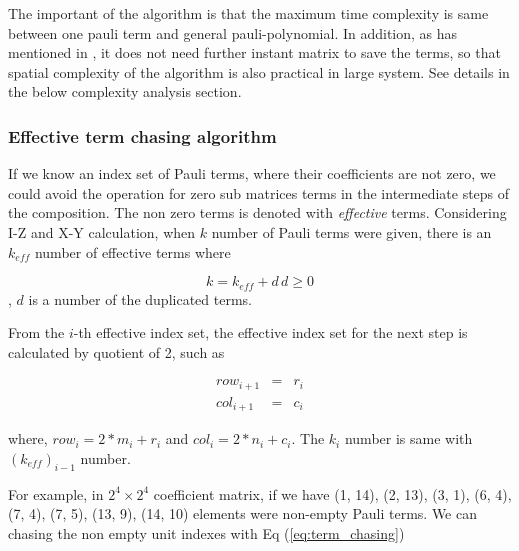 \documentclass[twocolumn]{article}
\begin{document}
The important of the algorithm is that 
the maximum time complexity is same between one pauli term and general pauli-polynomial.
In addition, as has mentioned in \cite{hantzko_tensorized_2023}, it does not need further 
instant matrix to save the terms, so that spatial complexity of the algorithm is also practical 
in large system.
See details in the below complexity analysis section.

\subsubsection{Effective term chasing algorithm}

If we know an index set of Pauli terms, where their coefficients are not zero,
we could avoid the operation for zero sub matrices terms in the intermediate steps of the composition.
The non zero terms is denoted with \textit{effective} terms. 
Considering I-Z and X-Y calculation, when $k$ number of Pauli terms were given, 
there is an $k_{eff}$ number of effective terms where

\begin{equation}
    k = k_{eff} + d\, d \geq 0
\end{equation}, $d$ is a number of the duplicated terms.

From the $i$-th effective index set, the effective index set for the next step is calculated by
quotient of 2, such as 

\begin{equation}
    \label{eq:term_chasing}
    \begin{array}{ccc}
        row_{i+1}&=& r_i \\
        col_{i+1}&=& c_i
    \end{array}
\end{equation}

where, $row_i = 2*m_i + r_i$ and $col_i = 2*n_i + c_i$.
The $k_i$ number is same with $(k_{eff})_{i-1}$ number. 

For example, in $2^4 \times 2^4$ coefficient matrix, 
if we have 
(1, 14), 
(2, 13), 
(3, 1), 
(6, 4),
(7, 4),
(7, 5),
(13, 9),
(14, 10) elements 
were non-empty Pauli terms. 
We can chasing the non empty unit indexes with Eq (\ref{eq:term_chasing})
\end{document}
